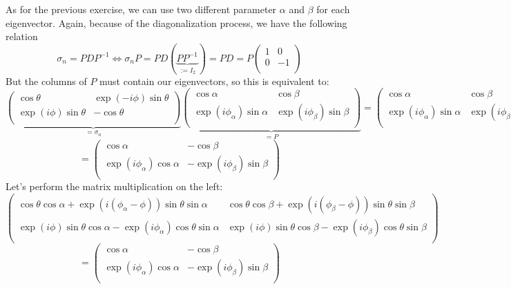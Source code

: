 \documentclass[solutions.tex]{subfiles}
\begin{document}
As for the previous exercise, we can use two different parameter
$\alpha$ and $\beta$ for each eigenvector. Again, because of the
diagonalization process, we have the following relation
\[
	\sigma_n = PDP^{-1} \Leftrightarrow \sigma_n P
		= PD(\underbrace{PP^{-1}}_{:=I_2}) = PD = P\begin{pmatrix}
		1 & 0 \\
		0 & -1 \\
	\end{pmatrix}
\]
But the columns of $P$ must contain our eigenvectors, so this
is equivalent to:
\[
	\underbrace{\begin{pmatrix}
		\cos\theta & \exp(-i\phi)\sin\theta \\
		\exp(i\phi)\sin\theta & -\cos\theta \\
	\end{pmatrix}}_{=\sigma_n}\underbrace{\begin{pmatrix}
		\cos\alpha & \cos\beta \\
		\exp(i\phi_\alpha)\sin\alpha & \exp(i\phi_\beta)\sin\beta \\
	\end{pmatrix}}_{=P} =\begin{pmatrix}
		\cos\alpha & \cos\beta \\
		\exp(i\phi_\alpha)\sin\alpha & \exp(i\phi_\beta)\sin\beta \\
	\end{pmatrix}\begin{pmatrix}
		1 & 0 \\
		0 & -1 \\
	\end{pmatrix}
\]
\[
	= \begin{pmatrix}
		\cos\alpha & -\cos\beta \\
		\exp(i\phi_\alpha)\cos\alpha & -\exp(i\phi_\beta)\sin\beta \\
	\end{pmatrix}
\]
Let's perform the
matrix multiplication on the left:
\[
	\begin{pmatrix}
		\cos\theta\cos\alpha + \exp(i(\phi_\alpha-\phi))\sin\theta\sin\alpha &
			\cos\theta\cos\beta + \exp(i(\phi_\beta-\phi))\sin\theta\sin\beta \\
		\exp(i\phi)\sin\theta\cos\alpha - \exp(i\phi_\alpha)\cos\theta\sin\alpha &
			\exp(i\phi)\sin\theta\cos\beta - \exp(i\phi_\beta)\cos\theta\sin\beta \\
	\end{pmatrix}
\]
\[ = \begin{pmatrix}
		\cos\alpha & -\cos\beta \\
		\exp(i\phi_\alpha)\cos\alpha & -\exp(i\phi_\beta)\sin\beta \\
	\end{pmatrix}
\]
\end{document}
